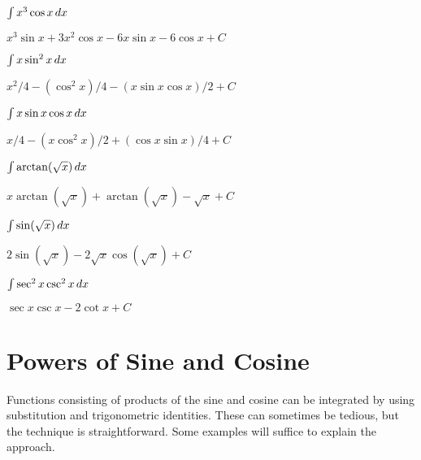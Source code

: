 \begin{exercises}
\begin{exercise} $\int x^3\cos x\, d x$
\begin{answer} $x^3\sin x+3x^2\cos x-6x\sin x-6\cos x+C$
\end{answer}\end{exercise}

\begin{exercise} $\int x\sin^2 x\, d x$
\begin{answer} $x^2/4-(\cos^2 x)/4-(x\sin x\cos x)/2+C$
\end{answer}\end{exercise}

\begin{exercise} $\int x\sin x\cos x\, d x$
\begin{answer} $x/4-(x\cos^2 x)/2+(\cos x\sin x)/4+C$
\end{answer}\end{exercise}

\begin{exercise} $\int \arctan(\sqrt x)\, d x$
\begin{answer} $x\arctan(\sqrt x)+\arctan(\sqrt x)-\sqrt{x}+C$
\end{answer}\end{exercise}

\begin{exercise} $\int \sin(\sqrt x)\, d x$
\begin{answer} $2\sin(\sqrt x)-2\sqrt x\cos(\sqrt x)+C$
\end{answer}\end{exercise}

\begin{exercise} $\int\sec^2 x\csc^2 x\, d x$
\begin{answer} $\sec x\csc x-2\cot x+C$
\end{answer}\end{exercise}

\endtwocol

\end{exercises}










\section{Powers of Sine and Cosine}


Functions consisting of products of the sine and cosine can be
integrated by using substitution and trigonometric identities. These
can sometimes be tedious, but the technique is straightforward. Some
examples will suffice to explain the approach.

